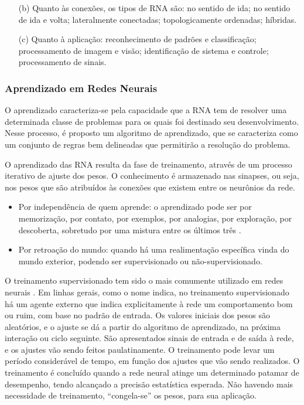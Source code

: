 \begin{itemize}
\begin{enumerate}
	\end{enumerate}

\pagebreak
	
  \item [(b)] Quanto às conexões, os tipos de RNA são: no sentido de ida; no sentido de ida e volta; 
	      lateralmente conectadas; topologicamente ordenadas; híbridas.
  
  \item [(c)] Quanto à aplicação: reconhecimento de padrões e classificação; processamento de imagem e visão; 
	      identificação de sistema e controle; processamento de sinais.
\end{itemize}


\subsubsection{Aprendizado em Redes Neurais}

O aprendizado caracteriza-se pela capacidade que a RNA tem de resolver uma determinada classe de problemas para os quais foi destinado 
seu desenvolvimento. 
Nesse processo, é proposto um algoritmo de aprendizado, que se caracteriza como um conjunto de regras bem delineadas que permitirão a 
resolução do problema. 

O aprendizado das RNA resulta da fase de treinamento, através de um processo iterativo de ajuste dos pesos. 
O conhecimento é armazenado nas sinapses, ou seja, nos pesos que são atribuídos às conexões que existem entre os neurônios da rede.

\begin{itemize}
 \item Por independência de quem aprende: o aprendizado pode ser por memorização, por contato, por exemplos, por analogias, por 
	exploração, por descoberta, sobretudo por uma mistura entre os últimos três \cite{Barreto2002}.
 \item Por retroação do mundo: quando há uma realimentação específica vinda do mundo exterior, podendo ser supervisionado ou 
	não-supervisionado. 
\end{itemize}

O treinamento supervisionado tem sido o mais comumente utilizado em redes neurais \cite{Barreto2002}. 
Em linhas gerais, como o nome indica, no treinamento supervisionado há um agente externo que indica explicitamente à rede um 
comportamento bom ou ruim, com base no padrão de entrada. Os valores iniciais dos pesos são aleatórios, e o ajuste se dá a partir do 
algoritmo de aprendizado, na próxima interação ou ciclo seguinte. São apresentados sinais de entrada e de saída à rede, e os ajustes 
vão sendo feitos paulatinamente. O treinamento pode levar um período considerável de tempo, em função dos ajustes que vão sendo 
realizados. O treinamento é concluído quando a rede neural atinge um determinado patamar de desempenho, tendo alcançado a precisão 
estatística esperada. 
Não havendo mais necessidade de treinamento, “congela-se” os pesos, para sua aplicação. 

